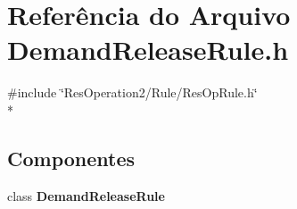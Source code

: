 \section{Referência do Arquivo Demand\+Release\+Rule.\+h}
\label{_demand_release_rule_8h}
{\ttfamily \#include \char`\"{}Res\+Operation2/\+Rule/\+Res\+Op\+Rule.\+h\char`\"{}}\\*
\subsection*{Componentes}
\begin{DoxyCompactItemize}
\item 
class {\bf Demand\+Release\+Rule}
\end{DoxyCompactItemize}
